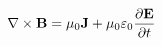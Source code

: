 \documentclass[preview]{standalone}
\begin{document}
\begin{align*}
\nabla \times \mathbf{B} = \mu_{0}\mathbf{J} + \mu_{0}\varepsilon_{0} \pdv{\mathbf{E}}{t}
\end{align*}
\end{document}

